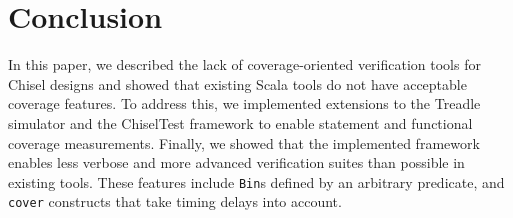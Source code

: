 \documentclass[conference]{IEEEtran}
\newcommand{\andrew}[1]{{\color{red} Andrew: #1}}
\newcommand{\hjd}[1]{{\color{pink} Hans: #1}}
\begin{document}
\section{Conclusion}

In this paper, we described the lack of coverage-oriented verification tools 
for Chisel designs and showed that existing Scala tools do not have acceptable coverage features. To 
address this, we implemented extensions to the Treadle simulator and the ChiselTest framework 
to enable statement and functional coverage measurements. Finally, we showed that the implemented 
framework enables less verbose and more advanced verification suites than possible in existing tools. 
These features include \texttt{Bin}s defined by an arbitrary predicate, and \texttt{cover} constructs that take timing delays into account. 
\end{document}
